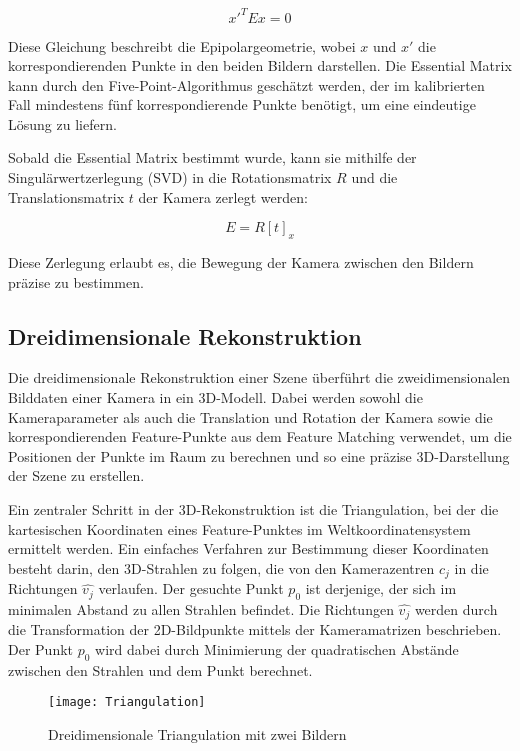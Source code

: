 \begin{equation}
x'^T E x = 0
\end{equation}

Diese Gleichung beschreibt die Epipolargeometrie, wobei \( x \) und \( x' \) die korrespondierenden Punkte in den beiden Bildern darstellen. Die Essential Matrix kann durch den Five-Point-Algorithmus geschätzt werden, der im kalibrierten Fall mindestens fünf korrespondierende Punkte benötigt, um eine eindeutige Lösung zu liefern.

Sobald die Essential Matrix bestimmt wurde, kann sie mithilfe der Singulärwertzerlegung (SVD) in die Rotationsmatrix \( R \) und die Translationsmatrix \( t \) der Kamera zerlegt werden:

\begin{equation}
E = R [t]_x
\end{equation}

Diese Zerlegung erlaubt es, die Bewegung der Kamera zwischen den Bildern präzise zu bestimmen.

\subsection{Dreidimensionale Rekonstruktion}

Die dreidimensionale Rekonstruktion einer Szene überführt die zweidimensionalen Bilddaten einer Kamera in ein 3D-Modell. Dabei werden sowohl die Kameraparameter als auch die Translation und Rotation der Kamera sowie die korrespondierenden Feature-Punkte aus dem Feature Matching verwendet, um die Positionen der Punkte im Raum zu berechnen und so eine präzise 3D-Darstellung der Szene zu erstellen.

Ein zentraler Schritt in der 3D-Rekonstruktion ist die Triangulation, bei der die kartesischen Koordinaten eines Feature-Punktes im Weltkoordinatensystem ermittelt werden. Ein einfaches Verfahren zur Bestimmung dieser Koordinaten besteht darin, den 3D-Strahlen zu folgen, die von den Kamerazentren \( c_j \) in die Richtungen \( \hat{v_j} \) verlaufen. Der gesuchte Punkt \( p_0 \) ist derjenige, der sich im minimalen Abstand zu allen Strahlen befindet. Die Richtungen \( \hat{v_j} \) werden durch die Transformation der 2D-Bildpunkte mittels der Kameramatrizen beschrieben. Der Punkt \( p_0 \) wird dabei durch Minimierung der quadratischen Abstände zwischen den Strahlen und dem Punkt berechnet.

\begin{figure}
    \centering
    \texttt{[image: Triangulation]}
    \caption{Dreidimensionale Triangulation mit zwei Bildern\label{fig:Triangulation}}\par
\end{figure}

